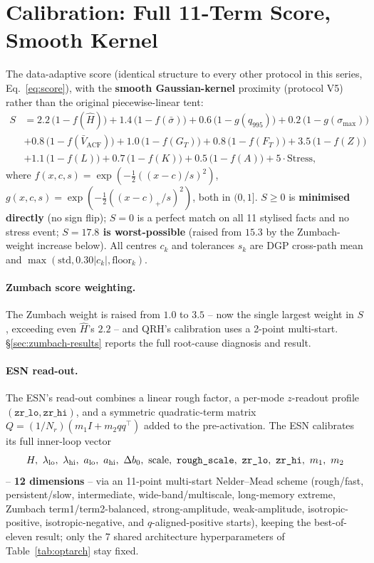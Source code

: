 \documentclass[11pt,a4paper]{article}
\begin{document}
\section{Calibration: Full 11-Term Score, Smooth Kernel}
\label{sec:calib}

The data-adaptive score (identical structure to every other protocol in
this series, Eq.~\eqref{eq:score}), with the \textbf{smooth
Gaussian-kernel} proximity (protocol V5) rather than the original
piecewise-linear tent:
\begin{equation}
\begin{aligned}
S &= 2.2\,\bigl(1-f(\hat H)\bigr)+1.4\,\bigl(1-f(\bar\sigma)\bigr)+0.6\,\bigl(1-g(q_{995})\bigr)+0.2\,\bigl(1-g(\sigma_{\max})\bigr)\\
  &+0.8\,\bigl(1-f(\bar V_{\mathrm{ACF}})\bigr)+1.0\,\bigl(1-f(G_T)\bigr)+0.8\,\bigl(1-f(F_T)\bigr)+\mathbf{3.5}\,\bigl(1-f(Z)\bigr)\\
  &+1.1\,\bigl(1-f(L)\bigr)+0.7\,\bigl(1-f(K)\bigr)+0.5\,\bigl(1-f(A)\bigr)+5\cdot\mathrm{Stress},
\end{aligned}
\label{eq:score}
\end{equation}
where $f(x,c,s)=\exp(-\tfrac12((x-c)/s)^2)$,
$g(x,c,s)=\exp(-\tfrac12((x-c)_+/s)^2)$, both in $(0,1]$. $S\geq0$ is
\textbf{minimised directly} (no sign flip); $S=0$ is a perfect match on
all 11 stylised facts and no stress event; \textbf{$S=17.8$ is
worst-possible} (raised from $15.3$ by the Zumbach-weight increase
below). All centres $c_k$ and tolerances $s_k$ are DGP cross-path mean
and $\max(\mathrm{std},0.30|c_k|,\mathrm{floor}_k)$.

\paragraph{Zumbach score weighting.} The Zumbach weight is raised
from $1.0$ to $\mathbf{3.5}$ -- now the single largest weight in $S$,
exceeding even $\hat H$'s $2.2$ -- and QRH's calibration uses a
2-point multi-start. \S\ref{sec:zumbach-results} reports the full
root-cause diagnosis and result.

\paragraph{ESN read-out.} The ESN's read-out combines a linear rough
factor, a per-mode $z$-readout profile
$(\texttt{zr\_lo},\texttt{zr\_hi})$, and a symmetric quadratic-term
matrix $Q=(1/N_r)(m_1I+m_2qq^\top)$ added to the pre-activation. The
ESN calibrates its full inner-loop vector
\[
H,\ \lambda_{\rm lo},\ \lambda_{\rm hi},\ a_{\rm lo},\ a_{\rm hi},\
\Delta b_0,\ \mathrm{scale},\ \texttt{rough\_scale},\
\texttt{zr\_lo},\ \texttt{zr\_hi},\ m_1,\ m_2
\]
-- \textbf{12 dimensions} -- via an 11-point multi-start
Nelder--Mead scheme (rough/fast, persistent/slow, intermediate,
wide-band/multiscale, long-memory extreme, Zumbach
term1/term2-balanced, strong-amplitude, weak-amplitude,
isotropic-positive, isotropic-negative, and $q$-aligned-positive
starts), keeping the best-of-eleven result; only the 7 shared
architecture hyperparameters of Table~\ref{tab:optarch} stay fixed.
\end{document}
